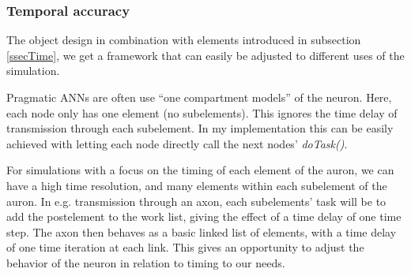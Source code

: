 		
		
		
		


		\subsubsection{Temporal accuracy}
		\label{sssecTemporalAccuracy}
		The object design in combination with elements introduced in subsection \ref{ssecTime}, we get a framework that can easily be adjusted to different uses of the simulation. 
		
		Pragmatic ANNs are often use ``one compartment models'' of the neuron. %
		Here, each node only has one element (no subelements). This ignores the time delay of transmission through each subelement. 
		In my implementation this can be easily achieved with letting each node directly call the next nodes' \emph{\small{doTask()}}. 

		
		For simulations with a focus on the timing of each element of the auron, we can have a high time resolution, and many elements within each subelement of the auron.
		In e.g. transmission through an axon, each subelements' task will be to add the postelement to the work list,%
			giving the effect of a time delay of one time step. 
		The axon then behaves as a basic linked list of elements, with a time delay of one time iteration at each link.
		This gives an opportunity to adjust the behavior of the neuron in relation to timing to our needs.


